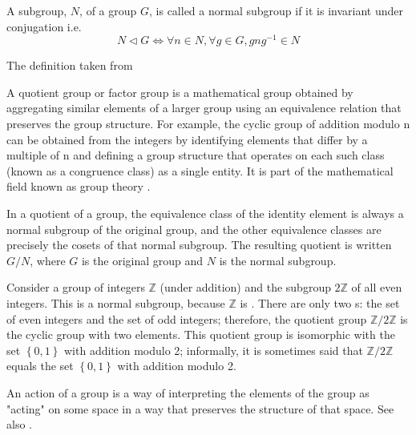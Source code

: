 \begin{appendices}
\begin{definition}
  A subgroup, $N$, of a group $G$, is called a normal subgroup if it
  is invariant under conjugation i.e. 
  \[
  N \triangleleft G \Leftrightarrow
  \forall n \in N, \forall g \in G, g n g^{-1} \in N
  \]
  
  The definition taken from \cite{wiki:normalsubgroup}
  \label{def:normalsubgroup}
\end{definition}

\begin{definition}
  A quotient group or factor group is a mathematical group obtained by
  aggregating similar elements of a larger group using an equivalence
  relation that preserves the group structure. For example, the cyclic
  group of addition modulo n can be obtained from the integers by
  identifying elements that differ by a multiple of n and defining a
  group structure that operates on each such class (known as a
  congruence class) as a single entity. It is part of the mathematical
  field known as group theory \cite{wiki:quotientgroup}. 

  In a quotient of a group, the equivalence class of the identity
  element is always a normal subgroup of the original group, and the
  other equivalence classes are precisely the cosets of that normal
  subgroup. The resulting quotient is written $G / N$, where $G$ is the
  original group and $N$ is the normal subgroup. 
  \label{def:quotientgroup}
\end{definition}

\begin{example}
  Consider \cite{wiki:quotientgroup} a group of integers $\mathbb{Z}$
  (under addition) and the 
  subgroup $2\mathbb{Z}$ of all even integers. This is a normal
  subgroup, because $\mathbb{Z}$ is . There
  are only two s: the set 
  of even integers and the set of odd integers; therefore, the
  quotient group $\mathbb{Z}/2\mathbb{Z}$ is the cyclic group with two
  elements. This 
  quotient group is isomorphic with the set $\left\{ 0, 1 \right\}$
  with addition modulo 2; informally, it is sometimes said that
  $\mathbb{Z}/2\mathbb{Z}$
  equals the set $\left\{ 0, 1 \right\}$ with addition modulo 2. 
  \label{ex:quotientgroup}
\end{example}

\begin{definition}[Action]
  An action of a group is a way of
  interpreting the elements of the 
  group as "acting" on some space in a way that preserves the structure
  of that space. See also \cite{wiki:groupaction}.
  \label{def:action}
\end{definition}


\end{appendices}

